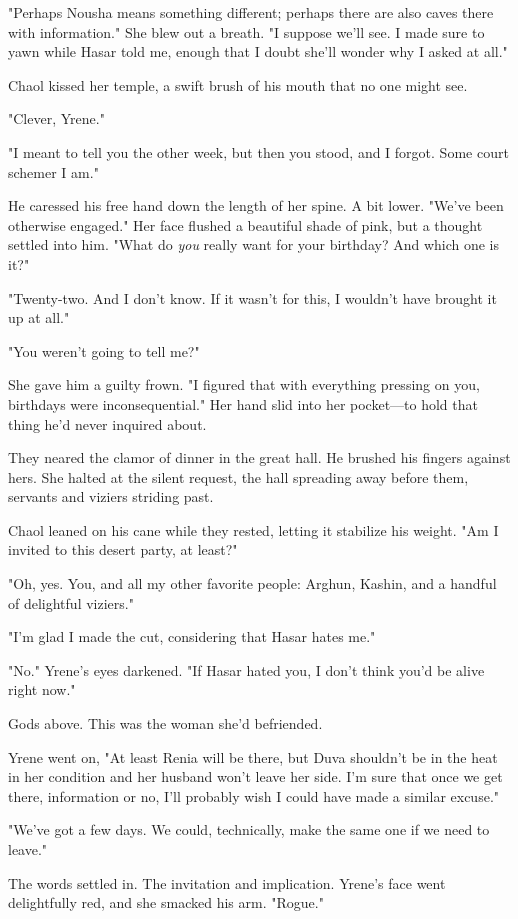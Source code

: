 "Perhaps Nousha means something different; perhaps there are also caves there with information." She blew out a breath. "I suppose we'll see. I made sure to yawn while Hasar told me, enough that I doubt she'll wonder why I asked at all."

Chaol kissed her temple, a swift brush of his mouth that no one might see.

"Clever, Yrene."

"I meant to tell you the other week, but then you stood, and I forgot. Some court schemer I am."

He caressed his free hand down the length of her spine. A bit lower. "We've been otherwise engaged." Her face flushed a beautiful shade of pink, but a thought settled into him. "What do \emph{you} really want for your birthday? And which one is it?"

"Twenty-two. And I don't know. If it wasn't for this, I wouldn't have brought it up at all."

"You weren't going to tell me?"

She gave him a guilty frown. "I figured that with everything pressing on you, birthdays were inconsequential." Her hand slid into her pocket---to hold that thing he'd never inquired about.

They neared the clamor of dinner in the great hall. He brushed his fingers against hers. She halted at the silent request, the hall spreading away before them, servants and viziers striding past.

Chaol leaned on his cane while they rested, letting it stabilize his weight. "Am I invited to this desert party, at least?"

"Oh, yes. You, and all my other favorite people: Arghun, Kashin, and a handful of delightful viziers."

"I'm glad I made the cut, considering that Hasar hates me."

"No." Yrene's eyes darkened. "If Hasar hated you, I don't think you'd be alive right now."

Gods above. This was the woman she'd befriended.

Yrene went on, "At least Renia will be there, but Duva shouldn't be in the heat in her condition and her husband won't leave her side. I'm sure that once we get there, information or no, I'll probably wish I could have made a similar excuse."

"We've got a few days. We could, technically, make the same one if we need to leave."

The words settled in. The invitation and implication. Yrene's face went delightfully red, and she smacked his arm. "Rogue."

